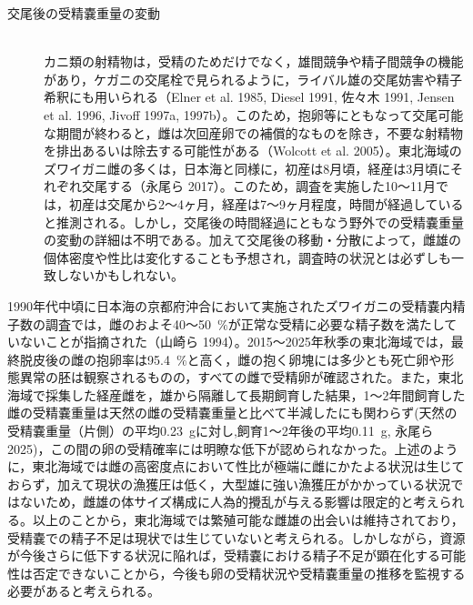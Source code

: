 \begin{description}
\item[交尾後の受精嚢重量の変動] \mbox{} \\
カニ類の射精物は，受精のためだけでなく，雄間競争や精子間競争の機能があり，ケガニの交尾栓で見られるように，ライバル雄の交尾妨害や精子希釈にも用いられる（Elner et al. 1985, Diesel 1991, 佐々木 1991, Jensen et al. 1996, Jivoff 1997a, 1997b）。このため，抱卵等にともなって交尾可能な期間が終わると，雌は次回産卵での補償的なものを除き，不要な射精物を排出あるいは除去する可能性がある（Wolcott et al. 2005）。東北海域のズワイガニ雌の多くは，日本海と同様に，初産は8月頃，経産は3月頃にそれぞれ交尾する（永尾ら 2017）。このため，調査を実施した10～11月では，初産は交尾から2～4ヶ月，経産は7～9ヶ月程度，時間が経過していると推測される。しかし，交尾後の時間経過にともなう野外での受精嚢重量の変動の詳細は不明である。加えて交尾後の移動・分散によって，雌雄の個体密度や性比は変化することも予想され，調査時の状況とは必ずしも一致しないかもしれない。

\end{description}

1990年代中頃に日本海の京都府沖合において実施されたズワイガニの受精嚢内精子数の調査では，雌のおよそ40～50~$\%$が正常な受精に必要な精子数を満たしていないことが指摘された（山崎ら 1994）。2015～2025年秋季の東北海域では，最終脱皮後の雌の抱卵率は95.4~$\%$と高く，雌の抱く卵塊には多少とも死亡卵や形態異常の胚は観察されるものの，すべての雌で受精卵が確認された。また，東北海域で採集した経産雌を，雄から隔離して長期飼育した結果，1～2年間飼育した雌の受精嚢重量は天然の雌の受精嚢重量と比べて半減したにも関わらず(天然の受精嚢重量（片側）の平均0.23~gに対し,飼育1～2年後の平均0.11~g, 永尾ら 2025)，この間の卵の受精確率には明瞭な低下が認められなかった。上述のように，東北海域では雌の高密度点において性比が極端に雌にかたよる状況は生じておらず，加えて現状の漁獲圧は低く，大型雄に強い漁獲圧がかかっている状況ではないため，雌雄の体サイズ構成に人為的攪乱が与える影響は限定的と考えられる。以上のことから，東北海域では繁殖可能な雌雄の出会いは維持されており，受精嚢での精子不足は現状では生じていないと考えられる。しかしながら，資源が今後さらに低下する状況に陥れば，受精嚢における精子不足が顕在化する可能性は否定できないことから，今後も卵の受精状況や受精嚢重量の推移を監視する必要があると考えられる。

